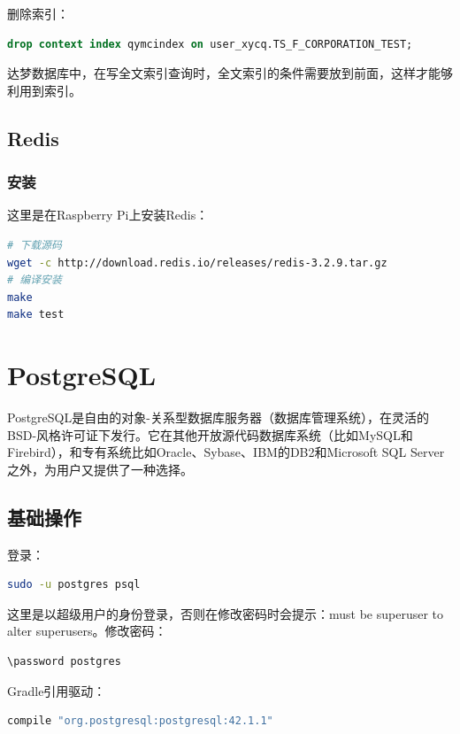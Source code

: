 \documentclass[letter]{book}
\begin{document}
删除索引：

\begin{lstlisting}[language=SQL]
drop context index qymcindex on user_xycq.TS_F_CORPORATION_TEST;
\end{lstlisting}

达梦数据库中，在写全文索引查询时，全文索引的条件需要放到前面，这样才能够利用到索引。

\section{Redis}

\subsection{安装}

这里是在Raspberry Pi上安装Redis：

\begin{lstlisting}[language=Bash]
# 下载源码
wget -c http://download.redis.io/releases/redis-3.2.9.tar.gz
# 编译安装
make
make test
\end{lstlisting}

\chapter{PostgreSQL}

PostgreSQL是自由的对象-关系型数据库服务器（数据库管理系统），在灵活的BSD-风格许可证下发行。它在其他开放源代码数据库系统（比如MySQL和Firebird），和专有系统比如Oracle、Sybase、IBM的DB2和Microsoft SQL Server之外，为用户又提供了一种选择。

\section{基础操作}

登录：

\begin{lstlisting}[language=Bash]
sudo -u postgres psql
\end{lstlisting}

这里是以超级用户的身份登录，否则在修改密码时会提示：must be superuser to alter superusers。修改密码：

\begin{lstlisting}[language=Bash]
\password postgres
\end{lstlisting}

Gradle引用驱动：

\begin{lstlisting}[language=Bash]
compile "org.postgresql:postgresql:42.1.1"
\end{lstlisting}
       
\end{document}
